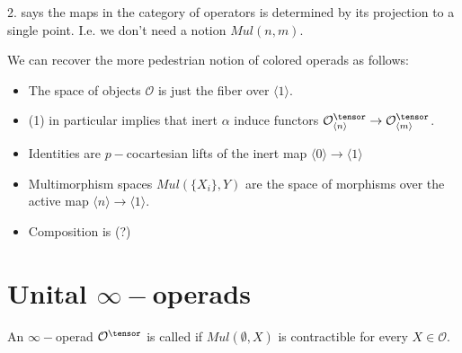 2. says the maps in the category of operators is determined by its projection to a single point. I.e. we don't need a notion $Mul(n,m)$.

\begin{remark}
    We can recover the more pedestrian notion of colored operads as follows:
    \begin{itemize}
        \item The space of objects $\mathcal{O}$ is just the fiber over $\langle 1\rangle$.
        \item (1) in particular implies that inert $\alpha$ induce functors $\mathcal{O}^\tensor_{\langle n \rangle}\rightarrow  \mathcal{O}^\tensor_{\langle m \rangle}$. 
        \item Identities are $p-$cocartesian lifts of the inert map $\langle 0 \rangle \rightarrow \langle 1 \rangle$
        \item Multimorphism spaces $Mul(\{X_i\},Y)$ are the space of morphisms over the active map $\langle n \rangle \rightarrow \langle 1 \rangle$.
        \item Composition is (?)
    \end{itemize}
\end{remark}



\section{Unital $\infty-$operads}
\begin{definition}
    An $\infty-$operad $\mathcal{O}^\tensor$ is called  if $Mul(\emptyset,X)$ is contractible for every $X\in \mathcal{O}$.
\end{definition}


